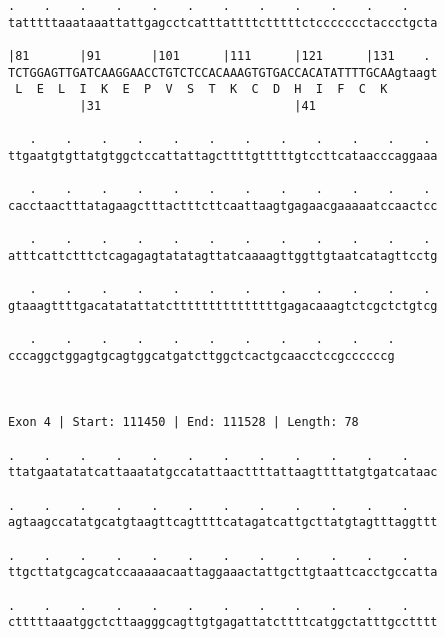 \documentclass{article}
\begin{document}
\begin{Verbatim}
.    .    .    .    .    .    .    .    .    .    .    .    
tatttttaaataaattattgagcctcatttattttctttttctccccccctaccctgcta
                                                            
|81       |91       |101      |111      |121      |131    . 
TCTGGAGTTGATCAAGGAACCTGTCTCCACAAAGTGTGACCACATATTTTGCAAgtaagt
 L  E  L  I  K  E  P  V  S  T  K  C  D  H  I  F  C  K       
          |31                           |41                 
  
   .    .    .    .    .    .    .    .    .    .    .    . 
ttgaatgtgttatgtggctccattattagcttttgtttttgtccttcataacccaggaaa
                                                            
   .    .    .    .    .    .    .    .    .    .    .    . 
cacctaactttatagaagctttactttcttcaattaagtgagaacgaaaaatccaactcc
                                                            
   .    .    .    .    .    .    .    .    .    .    .    . 
atttcattctttctcagagagtatatagttatcaaaagttggttgtaatcatagttcctg
                                                            
   .    .    .    .    .    .    .    .    .    .    .    . 
gtaaagttttgacatatattatctttttttttttttttgagacaaagtctcgctctgtcg
                                                            
   .    .    .    .    .    .    .    .    .    .    .
cccaggctggagtgcagtggcatgatcttggctcactgcaacctccgccccccg
                                                      
                                                      
 
Exon 4 | Start: 111450 | End: 111528 | Length: 78
 
.    .    .    .    .    .    .    .    .    .    .    .    
ttatgaatatatcattaaatatgccatattaacttttattaagttttatgtgatcataac
                                                            
.    .    .    .    .    .    .    .    .    .    .    .    
agtaagccatatgcatgtaagttcagttttcatagatcattgcttatgtagtttaggttt
                                                            
.    .    .    .    .    .    .    .    .    .    .    .    
ttgcttatgcagcatccaaaaacaattaggaaactattgcttgtaattcacctgccatta
                                                            
.    .    .    .    .    .    .    .    .    .    .    .    
ctttttaaatggctcttaagggcagttgtgagattatcttttcatggctatttgcctttt
                                                            

\end{Verbatim}
\end{document}
